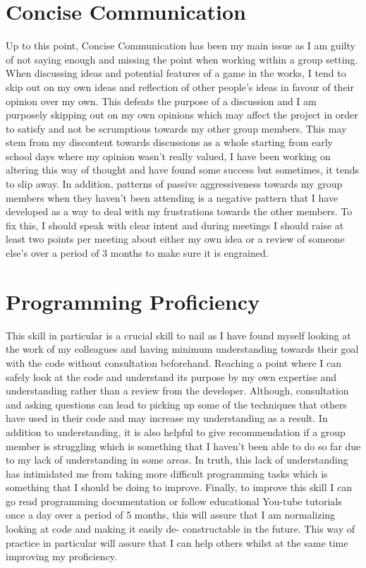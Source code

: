 \documentclass{scrartcl}
\begin{document}
\section{Concise Communication}

Up to this point, Concise Communication has been my main issue as I am guilty of not saying enough and missing the point when working within a group setting. When discussing ideas and potential features of a game in the works, I tend to skip out on my own ideas and reflection of other people's ideas in favour of their opinion over my own. This defeats the purpose of a discussion and I am purposely skipping out on my own opinions which may affect the project in order to satisfy and not be scrumptious towards my other group members. This may stem from my discontent towards discussions as a whole starting from early school days where my opinion wasn't really valued, I have been working on altering this way of thought and have found some success but sometimes, it tends to slip away. In addition, patterns of passive aggressiveness towards my group members when they haven't been attending is a negative pattern that I have developed as a way to deal with my frustrations towards the other members. To fix this, I should speak with clear intent and during meetings I should raise at least two points per meeting about either my own idea or a review of someone else's over a period of 3 months to make sure it is engrained.


\section{Programming Proficiency}

This skill in particular is a crucial skill to nail as I have found myself looking at the work of my colleagues and having minimum understanding towards their goal with the code without consultation beforehand. Reaching a point where I can safely look at the code and understand its purpose by my own expertise and understanding rather than a review from the developer. Although, consultation and asking questions can lead to picking up some of the techniques that others have used in their code and may increase my understanding as a result. In addition to understanding, it is also helpful to give recommendation if a group member is struggling which is something that I haven't been able to do so far due to my lack of understanding in some areas. In truth, this lack of understanding has intimidated me from taking more difficult programming tasks which is something that I should be doing to improve. Finally, to improve this skill I can go read programming documentation or follow educational You-tube tutorials once a day over a period of 5 months, this will assure that I am normalizing looking at code and making it easily de- constructable in the future. This way of practice in particular will assure that I can help others whilst at the same time improving my proficiency.  
\end{document}
